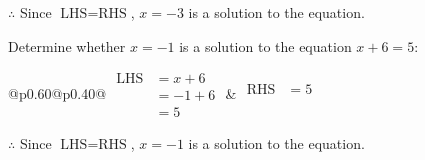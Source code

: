 \documentclass[12pt]{article}
\newcounter{minipagecount}
\begin{document}
\begin{multicols}{2}
\begin{minipage}[t]{0.40\textwidth}
    \noindent \(\therefore\) Since \(\text{LHS} = \text{RHS}\), \(x = -3\) is  a solution to the equation.

\end{minipage}

\vspace*{0.5ex}
\vfill{}
\noindent{(\theminipagecount)}\hspace{0.1mm} %
\begin{minipage}[t]{0.40\textwidth} %

    \noindent Determine whether \(x = -1\) is a solution to the equation \(x + 6 = 5\):
    \vspace{2pt}  %

    \noindent
    \renewcommand{\arraystretch}{1.3} %
    \begin{tabular}{@{}p{0.60\linewidth}@{}p{0.40\linewidth}@{}}
        \(\begin{aligned}
            \text{LHS} &= x + 6 \\
                    &= -1 + 6 \\
                    &= 5 
        \end{aligned}\) &
        \(\begin{aligned}
            \text{RHS} &= 5\\
                    & \\
                    &
        \end{aligned}\)
    \end{tabular}
    \renewcommand{\arraystretch}{1.0} %
    \vspace{2pt}  %

    \noindent \(\therefore\) Since \(\text{LHS} = \text{RHS}\), \(x = -1\) is  a solution to the equation.

\end{minipage}

\vspace*{0.5ex}
\vfill{}
\noindent{(\theminipagecount)}\hspace{0.1mm} %
\begin{minipage}[t]{0.40\textwidth} %


\end{minipage}
\end{multicols}
\end{document}
